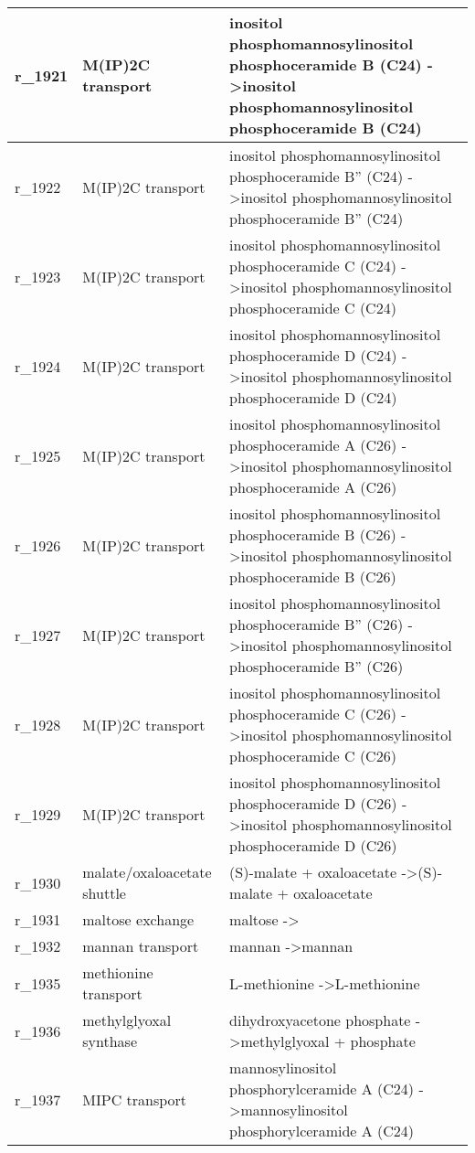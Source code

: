 \begin{landscape}
{\begin{longtable}{|l|p{7cm}|p{15cm}|}
r\_1921 & M(IP)2C transport & inositol phosphomannosylinositol phosphoceramide B (C24)  -\textgreater inositol phosphomannosylinositol phosphoceramide B (C24) \\ \hline
r\_1922 & M(IP)2C transport & inositol phosphomannosylinositol phosphoceramide B'' (C24)  -\textgreater inositol phosphomannosylinositol phosphoceramide B'' (C24) \\ \hline
r\_1923 & M(IP)2C transport & inositol phosphomannosylinositol phosphoceramide C (C24)  -\textgreater inositol phosphomannosylinositol phosphoceramide C (C24) \\ \hline
r\_1924 & M(IP)2C transport & inositol phosphomannosylinositol phosphoceramide D (C24)  -\textgreater inositol phosphomannosylinositol phosphoceramide D (C24) \\ \hline
r\_1925 & M(IP)2C transport & inositol phosphomannosylinositol phosphoceramide A (C26)  -\textgreater inositol phosphomannosylinositol phosphoceramide A (C26) \\ \hline
r\_1926 & M(IP)2C transport & inositol phosphomannosylinositol phosphoceramide B (C26)  -\textgreater inositol phosphomannosylinositol phosphoceramide B (C26) \\ \hline
r\_1927 & M(IP)2C transport & inositol phosphomannosylinositol phosphoceramide B'' (C26)  -\textgreater inositol phosphomannosylinositol phosphoceramide B'' (C26) \\ \hline
r\_1928 & M(IP)2C transport & inositol phosphomannosylinositol phosphoceramide C (C26)  -\textgreater inositol phosphomannosylinositol phosphoceramide C (C26) \\ \hline
r\_1929 & M(IP)2C transport & inositol phosphomannosylinositol phosphoceramide D (C26)  -\textgreater inositol phosphomannosylinositol phosphoceramide D (C26) \\ \hline
r\_1930 & malate/oxaloacetate shuttle & (S)-malate + oxaloacetate  -\textgreater (S)-malate + oxaloacetate \\ \hline
r\_1931 & maltose exchange & maltose  -\textgreater{} \\ \hline
r\_1932 & mannan transport & mannan  -\textgreater mannan \\ \hline
r\_1935 & methionine transport & L-methionine  -\textgreater L-methionine \\ \hline
r\_1936 & methylglyoxal synthase & dihydroxyacetone phosphate  -\textgreater methylglyoxal + phosphate \\ \hline
r\_1937 & MIPC transport & mannosylinositol phosphorylceramide A (C24)  -\textgreater mannosylinositol phosphorylceramide A (C24) \\ \hline

\end{longtable}}
\end{landscape}
